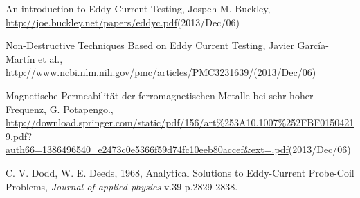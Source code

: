 \documentclass[a4paper]{article}
\begin{document}
\begin{thebibliography}{99}
%	
%
		
	 An introduction to Eddy Current Testing, Jospeh M. Buckley, \url{http://joe.buckley.net/papers/eddyc.pdf}(2013/Dec/06) 

	 Non-Destructive Techniques Based on Eddy Current Testing, Javier García-Martín et al., \url{http://www.ncbi.nlm.nih.gov/pmc/articles/PMC3231639/}(2013/Dec/06) 

	 Magnetische Permeabilität der ferromagnetischen Metalle bei sehr hoher Frequenz, G. Potapengo., \url{http://download.springer.com/static/pdf/156/art\%253A10.1007\%252FBF01504219.pdf?auth66=1386496540_e2473c0e5366f59d74fc10eeb80accef&ext=.pdf}(2013/Dec/06)
	
		 C. V. Dodd, W. E. Deeds, 1968, Analytical Solutions to Eddy-Current Probe-Coil Problems, \emph{Journal of applied physics} v.39 p.2829-2838.
\end{thebibliography}
\end{document}
